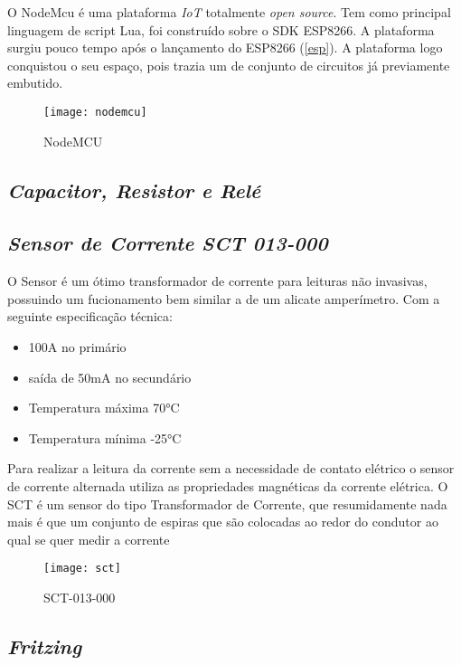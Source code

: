 O NodeMcu é uma plataforma \textit{IoT} totalmente \textit{open source}. Tem como principal linguagem de script Lua, foi construído sobre o SDK ESP8266.
A plataforma surgiu pouco tempo após o lançamento do ESP8266 (\autoref{esp}). A plataforma logo conquistou o seu espaço, pois trazia um de conjunto
de circuitos já previamente embutido.

\begin{figure}[h!]
	\texttt{[image: nodemcu]}
	\centering
	\caption[NodeMCU]{NodeMCU}
	\label{fig:nodemcu}
\end{figure}
\FloatBarrier

\subsection[\textit{Capacitor, Resistor e Relé}]{\textit{Capacitor, Resistor e Relé}}\label{crr}
\subsection[\textit{Sensor de Corrente SCT 013-000}]{\textit{Sensor de Corrente SCT 013-000}}\label{sct}
O Sensor é um ótimo transformador de corrente para leituras não invasivas, possuindo um fucionamento bem similar a de um alicate amperímetro. Com a seguinte especificação
técnica: 
\begin{itemize}
	\item 100A no primário
	\item saída de 50mA no secundário
	\item Temperatura máxima \ang{70}C
	\item Temperatura mínima \ang{-25}C
\end{itemize} 
Para realizar a leitura da corrente sem a necessidade de contato elétrico o sensor de corrente alternada utiliza as propriedades 
magnéticas da corrente elétrica. O SCT é um sensor do tipo Transformador de Corrente, que resumidamente nada mais é que um conjunto de espiras que são
colocadas ao redor do condutor ao qual se quer medir a corrente 

\begin{figure}[h!]
	\texttt{[image: sct]}
	\centering
	\caption[SCT-013-000]{SCT-013-000}
	\label{fig:sct}
\end{figure}
\FloatBarrier

\subsection[\textit{Fritzing}]{\textit{Fritzing}}\label{fritzing}

